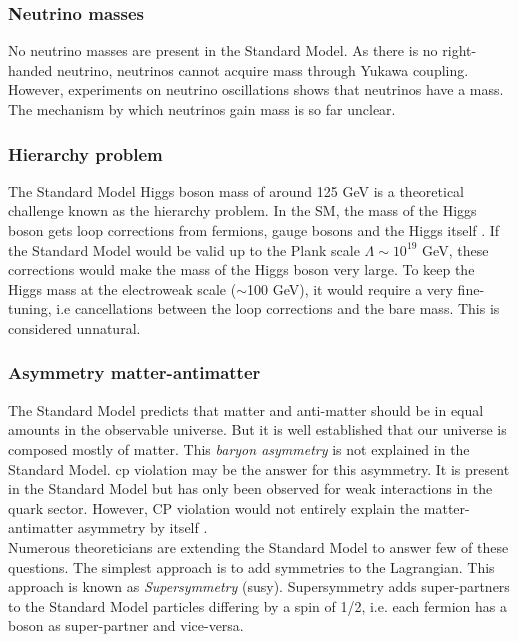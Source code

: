 \subsubsection*{Neutrino masses}

No neutrino masses are present in the Standard Model. As there is no right-handed neutrino, neutrinos cannot acquire mass through Yukawa coupling. However, experiments on neutrino oscillations \cite{Dore:2008dp} shows that neutrinos have a mass. The mechanism by which neutrinos gain mass is so far unclear.

\subsubsection*{Hierarchy problem}

The Standard Model Higgs boson mass of around 125 GeV is a theoretical challenge known as the hierarchy problem. In the SM, the mass of the Higgs boson gets loop corrections from fermions, gauge bosons and the Higgs itself \cite{Vieira:2012ex}. If the Standard Model would be valid up to the Plank scale $\Lambda \sim 10^{19}$ GeV, these corrections would make the mass of the Higgs boson very large. To keep the Higgs mass at the electroweak scale ($\sim$100 GeV), it would require a very fine-tuning, i.e cancellations between the loop corrections and the bare mass. This is considered unnatural.

\subsubsection*{Asymmetry matter-antimatter}

The Standard Model predicts that matter and anti-matter should be in equal amounts in the observable universe. But it is well established that our universe is composed mostly of matter. This \textit{baryon asymmetry} is not explained in the Standard Model. \acrshort{cp} violation \cite{Ellis:1978hq} may be the answer for this asymmetry. It is present in the Standard Model but has only been observed for weak interactions in the quark sector. However, CP violation would not entirely explain the matter-antimatter asymmetry by itself \cite{Sakharov:1967dj}.\\[0.3cm]

Numerous theoreticians are extending the Standard Model to answer few of these questions. The simplest approach is to add symmetries to the Lagrangian. This approach is known as \textit{Supersymmetry} (\acrshort{susy}). Supersymmetry adds super-partners to the Standard Model particles differing by a spin of 1/2, i.e. each fermion has a boson as super-partner and vice-versa.

